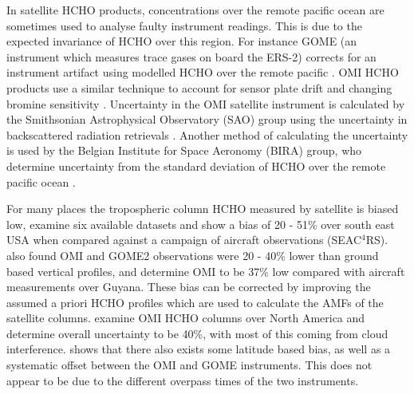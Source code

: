     In satellite HCHO products, concentrations over the remote pacific ocean are sometimes used to analyse faulty instrument readings.
    This is due to the expected invariance of HCHO over this region.
    For instance GOME (an instrument which measures trace gases on board the ERS-2) corrects for an instrument artifact using modelled HCHO over the remote pacific \parencite{Shim2005}.
    OMI HCHO products use a similar technique to account for sensor plate drift and changing bromine sensitivity \parencite{Abad2015}.
    Uncertainty in the OMI satellite instrument is calculated by the Smithsonian Astrophysical Observatory (SAO) group using the uncertainty in backscattered radiation retrievals \parencite{Abad2015, Abad2016}.
    Another method of calculating the uncertainty is used by the Belgian Institute for Space Aeronomy (BIRA) group, who determine uncertainty from the standard deviation of HCHO over the remote pacific ocean \parencite{DeSmedt2012, DeSmedt2015}.
    
    
    For many places the tropospheric column HCHO measured by satellite is biased low, \textcite{Zhu2016} examine six available datasets and show a bias of 20 - 51\% over south east USA when compared against a campaign of aircraft observations (SEAC$^4$RS).
    \textcite{DeSmedt2015} also found OMI and GOME2 observations were 20 - 40\% lower than ground based vertical profiles, and \textcite{Barkley2013} determine OMI to be 37\% low compared with aircraft measurements over Guyana.
    These bias can be corrected by improving the assumed a priori HCHO profiles which are used to calculate the AMFs of the satellite columns.
    \textcite{Millet2006} examine OMI HCHO columns over North America and determine overall uncertainty to be 40\%, with most of this coming from cloud interference.
    \textcite{Millet2008} shows that there also exists some latitude based bias, as well as a systematic offset between the OMI and GOME instruments.
    This does not appear to be due to the different overpass times of the two instruments.
    
    
